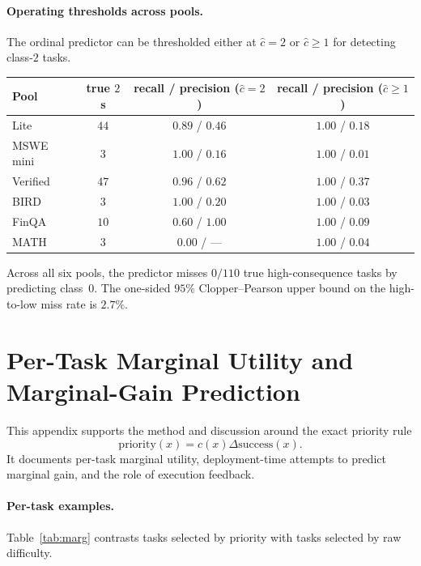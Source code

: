 \documentclass{article}
\begin{document}
\paragraph{Operating thresholds across pools.}
The ordinal predictor can be thresholded either at $\hat{c}=2$ or
$\hat{c}\ge1$ for detecting class-$2$ tasks.

\begin{center}
\small
\begin{tabular}{lccc}
\toprule
Pool & true $2$s & recall / precision ($\hat{c}=2$) & recall / precision ($\hat{c}\ge1$) \\
\midrule
Lite      & $44$ & $0.89$ / $0.46$ & $1.00$ / $0.18$ \\
MSWE mini & $3$  & $1.00$ / $0.16$ & $1.00$ / $0.01$ \\
Verified  & $47$ & $0.96$ / $0.62$ & $1.00$ / $0.37$ \\
BIRD      & $3$  & $1.00$ / $0.20$ & $1.00$ / $0.03$ \\
FinQA     & $10$ & $0.60$ / $1.00$ & $1.00$ / $0.09$ \\
MATH      & $3$  & $0.00$ / ---    & $1.00$ / $0.04$ \\
\bottomrule
\end{tabular}
\end{center}

Across all six pools, the predictor misses $0/110$ true
high-consequence tasks by predicting class~0. The one-sided
$95\%$ Clopper--Pearson upper bound on the high-to-low miss rate is
$2.7\%$.

\section{Per-Task Marginal Utility and Marginal-Gain Prediction}
\label{app:marginal}

This appendix supports the method and discussion around the exact
priority rule
\[
\mathrm{priority}(x)=c(x)\Delta\mathrm{success}(x).
\]
It documents per-task marginal utility, deployment-time attempts to
predict marginal gain, and the role of execution feedback.

\paragraph{Per-task examples.}
Table~\ref{tab:marg} contrasts tasks selected by priority with tasks
selected by raw difficulty.
\end{document}
